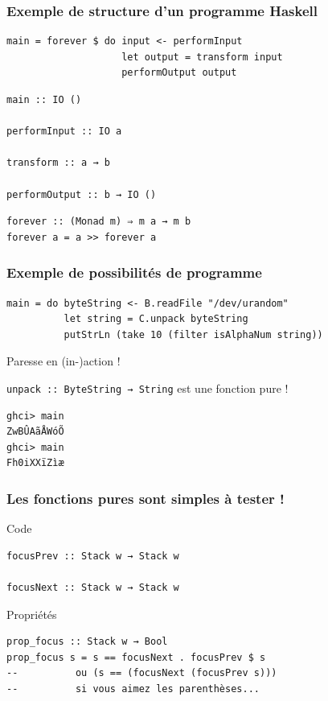 \documentclass[10pt]{beamer}
\begin{document}
\begin{frame}[fragile]
\frametitle{Exemple de structure d'un programme Haskell}
\begin{verbatim}
main = forever $ do input <- performInput
                    let output = transform input
                    performOutput output
\end{verbatim}

\begin{verbatim}
main :: IO ()

performInput :: IO a

transform :: a → b

performOutput :: b → IO ()
\end{verbatim}

\pause

\begin{verbatim}
forever :: (Monad m) ⇒ m a → m b
forever a = a >> forever a
\end{verbatim}

\end{frame}



\begin{frame}[fragile]
\frametitle{Exemple de possibilités de programme}
\begin{verbatim}
main = do byteString <- B.readFile "/dev/urandom"
          let string = C.unpack byteString
          putStrLn (take 10 (filter isAlphaNum string))
\end{verbatim}

Paresse en (in-)action !

\verb|unpack :: ByteString → String| est une fonction pure !

\begin{verbatim}
ghci> main
ZwBÛAãÅWóÕ
ghci> main
Fh0iXXïZìæ
\end{verbatim}
\end{frame}



\begin{frame}[fragile]
\frametitle{Les fonctions pures sont simples à tester !}
\begin{block}{Code}
\begin{verbatim}
focusPrev :: Stack w → Stack w

focusNext :: Stack w → Stack w
\end{verbatim}
\end{block}
\pause
\begin{block}{Propriétés}
\begin{verbatim}
prop_focus :: Stack w → Bool
prop_focus s = s == focusNext . focusPrev $ s
--          ou (s == (focusNext (focusPrev s)))
--          si vous aimez les parenthèses...
\end{verbatim}
\end{block}
\end{frame}
\end{document}

